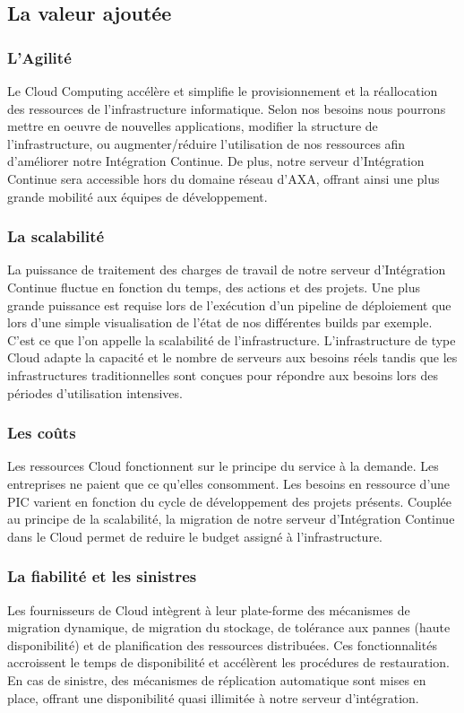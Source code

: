       \subsection{La valeur ajoutée}
        \subsubsection{L'Agilité}
        Le Cloud Computing accélère et simplifie le provisionnement et la réallocation des ressources de l'infrastructure informatique. Selon nos besoins nous pourrons mettre en oeuvre de nouvelles applications, modifier la structure de l'infrastructure, ou augmenter/réduire l'utilisation de nos ressources afin d'améliorer notre Intégration Continue. De plus, notre serveur d'Intégration Continue sera accessible hors du domaine réseau d'AXA, offrant ainsi une plus grande mobilité aux équipes de développement.

        \subsubsection{La scalabilité}
        La puissance de traitement des charges de travail de notre serveur d'Intégration Continue fluctue en fonction du temps, des actions et des projets. Une plus grande puissance est requise lors de l'exécution d'un pipeline de déploiement que lors d'une simple visualisation de l'état de nos différentes builds par exemple. C'est ce que l'on appelle la scalabilité de l'infrastructure. L'infrastructure de type Cloud adapte la capacité et le nombre de serveurs aux besoins réels tandis que les infrastructures traditionnelles sont conçues pour répondre aux besoins lors des périodes d'utilisation intensives.

        \subsubsection{Les coûts}
        Les ressources Cloud fonctionnent sur le principe du service à la demande. Les entreprises ne paient que ce qu'elles consomment. Les besoins en ressource d'une PIC varient en fonction du cycle de développement des projets présents. Couplée au principe de la scalabilité, la migration de notre serveur d'Intégration Continue dans le Cloud permet de reduire le budget assigné à l'infrastructure.

        \subsubsection{La fiabilité et les sinistres}
        Les fournisseurs de Cloud intègrent à leur plate-forme des mécanismes de migration dynamique, de migration du stockage, de tolérance aux pannes (haute disponibilité) et de planification des ressources distribuées. Ces fonctionnalités accroissent le temps de disponibilité et accélèrent les procédures de restauration. En cas de sinistre, des mécanismes de réplication automatique sont mises en place, offrant une disponibilité quasi illimitée à notre serveur d'intégration.


